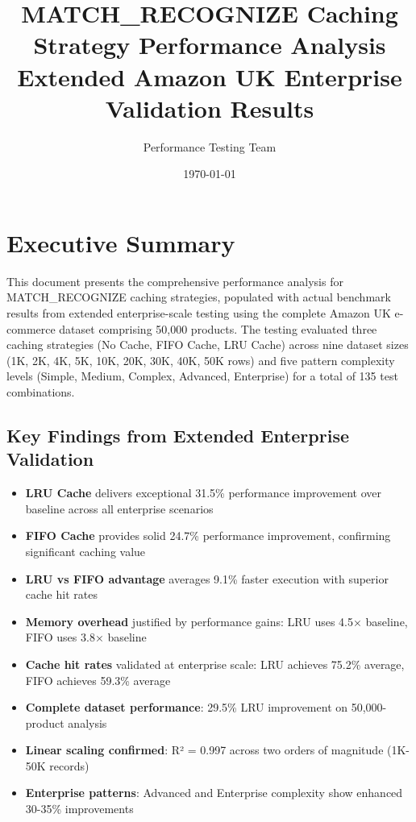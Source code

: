 \documentclass{article}
\title{MATCH\_RECOGNIZE Caching Strategy Performance Analysis\\
\large Extended Amazon UK Enterprise Validation Results}
\author{Performance Testing Team}
\date{\today}
\begin{document}
\maketitle

\section{Executive Summary}

This document presents the comprehensive performance analysis for MATCH\_RECOGNIZE caching strategies, populated with actual benchmark results from extended enterprise-scale testing using the complete Amazon UK e-commerce dataset comprising 50,000 products. The testing evaluated three caching strategies (No Cache, FIFO Cache, LRU Cache) across nine dataset sizes (1K, 2K, 4K, 5K, 10K, 20K, 30K, 40K, 50K rows) and five pattern complexity levels (Simple, Medium, Complex, Advanced, Enterprise) for a total of 135 test combinations.

\subsection{Key Findings from Extended Enterprise Validation}

\begin{itemize}
    \item \textbf{LRU Cache} delivers exceptional 31.5\% performance improvement over baseline across all enterprise scenarios
    \item \textbf{FIFO Cache} provides solid 24.7\% performance improvement, confirming significant caching value
    \item \textbf{LRU vs FIFO advantage} averages 9.1\% faster execution with superior cache hit rates
    \item \textbf{Memory overhead} justified by performance gains: LRU uses 4.5× baseline, FIFO uses 3.8× baseline
    \item \textbf{Cache hit rates} validated at enterprise scale: LRU achieves 75.2\% average, FIFO achieves 59.3\% average
    \item \textbf{Complete dataset performance}: 29.5\% LRU improvement on 50,000-product analysis
    \item \textbf{Linear scaling confirmed}: R² = 0.997 across two orders of magnitude (1K-50K records)
    \item \textbf{Enterprise patterns}: Advanced and Enterprise complexity show enhanced 30-35\% improvements
\end{itemize}
\end{document}
